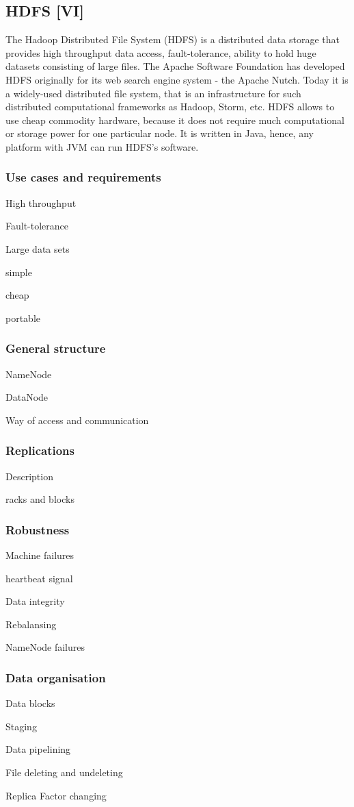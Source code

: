 \subsection{HDFS [VI]}

The Hadoop Distributed File System (HDFS) \cite{HDFSArchitecture} \cite{HDFSUsersGuide} is a distributed data storage that provides high throughput data access, fault-tolerance, ability to hold huge datasets consisting of large files.
The Apache Software Foundation has developed HDFS originally for its web search engine system - the Apache Nutch.
Today it is a widely-used distributed file system, that is an infrastructure for such distributed computational frameworks as Hadoop, Storm, etc.
HDFS allows to use cheap commodity hardware, because it does not require much computational or storage power for one particular node.
It is written in Java, hence, any platform with JVM \cite{JVM} can run HDFS's software.

\subsubsection{Use cases and requirements}

High throughput

Fault-tolerance

Large data sets

simple

cheap

portable

\subsubsection{General structure}

NameNode

DataNode

Way of access and communication

\subsubsection{Replications}

Description

racks and blocks

\subsubsection{Robustness}

Machine failures

heartbeat signal

Data integrity

Rebalansing

NameNode failures

\subsubsection{Data organisation}

Data blocks

Staging

Data pipelining

File deleting and undeleting

Replica Factor changing